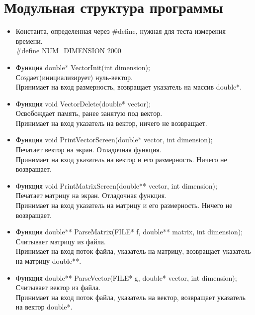\documentclass[12pt]{article}
\begin{document}
\section{Модульная структура программы}
\begin{itemize}
\item Константа, определенная через \#define, нужная для теста измерения времени.\\
\#define  NUM\_DIMENSION 2000\\

\item Функция double* VectorInit(int dimension);\\
Создает(инициализирует) нуль-вектор.\\
Принимает на вход размерность, возвращает указатель на массив double*.\\
\item Функция void VectorDelete(double* vector);\\
Освобождает память, ранее занятую под вектор.\\
Принимает на вход указатель на вектор, ничего не возвращает.\\
\item  Функция void PrintVectorScreen(double* vector, int dimension);\\
Печатает вектор на экран. Отладочная функция.\\
Принимает на вход указатель на вектор и его размерность. Ничего не возвращает.\\
\item  Функция void PrintMatrixScreen(double** vector, int dimension);\\
Печатает матрицу на экран. Отладочная функция.\\
Принимает на вход указатель на матрицу и его размерность. Ничего не возвращает.\\
\item Функция double** ParseMatrix(FILE* f, double** matrix, int dimension);\\
Считывает матрицу из файла.\\
Принимает на вход поток файла, указатель на матрицу, возвращает указатель на матрицу double**.\\
\item Функция double** ParseVector(FILE* g, double* vector, int dimension);\\
Считывает вектор из файла.\\
Принимает на вход поток файла, указатель на вектор, возвращает указатель на вектор double*.\\

\end{itemize}
\end{document}
